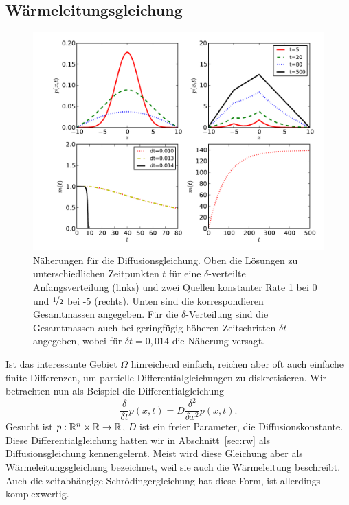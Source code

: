 \subsection{Wärmeleitungsgleichung}

\begin{figure}
  \centering
  \includegraphics[width=\textwidth]{plots/waermeleitung}
  \caption{Näherungen für die Diffusionsgleichung. Oben die Lösungen
    zu unterschiedlichen Zeitpunkten $t$ für eine $\delta$-verteilte
    Anfangsverteilung (links) und zwei Quellen konstanter Rate 1 bei 0
    und $\nicefrac{1}{2}$ bei -5 (rechts). Unten sind die
    korrespondieren Gesamtmassen angegeben. Für die
    $\delta$-Verteilung sind die Gesamtmassen auch bei geringfügig
    höheren Zeitschritten $\delta t$ angegeben, wobei für $\delta
    t=0,014$ die Näherung versagt.}
  \label{fig:waermeleitung}
\end{figure}

Ist das interessante Gebiet $\Omega$ hinreichend einfach, reichen aber
oft auch einfache finite Differenzen, um partielle
Differentialgleichungen zu diskretisieren.  Wir betrachten nun als
Beispiel die Differentialgleichung
\begin{equation}
  \label{eq:diffdgl}
  \frac{\delta}{\delta t} p(x, t) =
  D\frac{\delta^2}{\delta x^2} p(x, t).
\end{equation}
Gesucht ist $p:\mathbb{R}^n\times\mathbb{R}\to\mathbb{R}$, $D$ ist ein freier Parameter,
die Diffusionskonstante. Diese Differentialgleichung hatten wir in
Abschnitt~\ref{sec:rw} als Diffusionsgleichung kennengelernt. Meist
wird diese Gleichung aber als Wärmeleitungsgleichung bezeichnet, weil
sie auch die Wärmeleitung beschreibt. Auch die zeitabhängige
Schrödingergleichung hat diese Form, ist allerdings komplexwertig.

